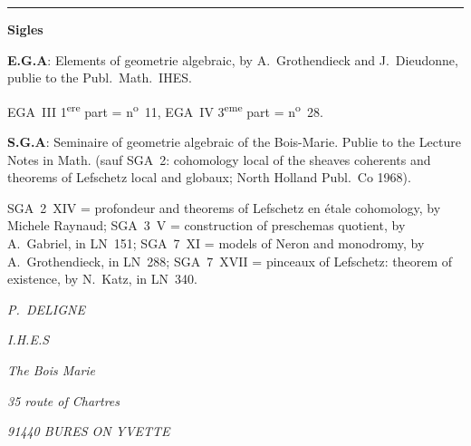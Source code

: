 \documentclass[12pt,a4paper]{article}
\theoremstyle{plain}
\theoremstyle{definition}
\theoremstyle{remark}
\begin{document}
\vspace{1em}

\begin{center}
\rule{0.6\textwidth}{0.4pt}
\end{center}

\vspace{0.5em}

\noindent\textbf{Sigles}

\medskip

\noindent\textbf{E.G.A}: Elements of geometrie algebraic, by A.~Grothendieck and J.~Dieudonne, publie to the Publ.~Math.~IHES.

\noindent EGA~III 1\textsuperscript{ere} part = n\textsuperscript{o}~11, EGA~IV 3\textsuperscript{eme} part = n\textsuperscript{o}~28.

\medskip

\noindent\textbf{S.G.A}: Seminaire of geometrie algebraic of the Bois-Marie. Publie to the Lecture Notes in Math. (sauf SGA~2: cohomology local of the sheaves coherents and theorems of Lefschetz local and globaux; North Holland Publ.~Co 1968).

\noindent SGA~2~XIV = profondeur and theorems of Lefschetz en étale cohomology, by Michele Raynaud; SGA~3~V = construction of preschemas quotient, by A.~Gabriel, in LN~151; SGA~7~XI = models of Neron and monodromy, by A.~Grothendieck, in LN~288; SGA~7~XVII = pinceaux of Lefschetz: theorem of existence, by N.~Katz, in LN~340.

\vspace{2em}

\begin{flushright}
\textit{P.~DELIGNE}

\textit{I.H.E.S}

\textit{The Bois Marie}

\textit{35 route of Chartres}

\textit{91440 BURES ON YVETTE}
\end{flushright}
\end{document}
